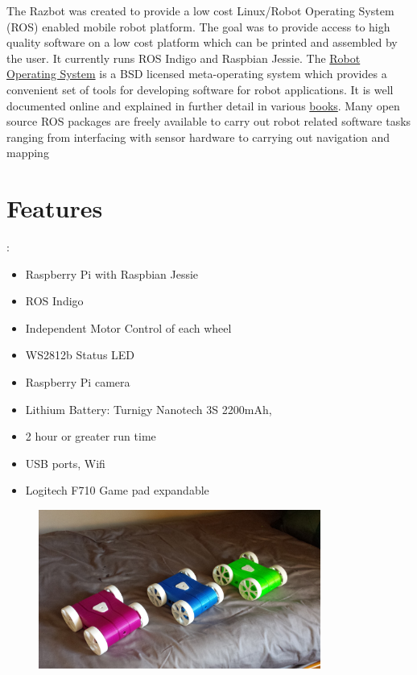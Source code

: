 \documentclass[12pt,titlepage,oneside]{memoir}
\begin{document}
The Razbot was created to provide a low cost Linux/Robot Operating System (ROS) enabled mobile robot platform. The goal was to provide access to high quality software on a low cost platform which can be printed and assembled by the user. It currently runs ROS Indigo and Raspbian Jessie. The \href{http://wiki.ros.org/ROS/Introduction}{Robot Operating System} is a BSD licensed meta-operating system which provides a convenient set of tools for developing software for robot applications. It is well documented online and explained in further detail in various \href{http://wiki.ros.org/Books}{books}. Many open source ROS packages are freely available to carry out robot related software tasks ranging from interfacing with sensor hardware to carrying out navigation and mapping \\

\section{Features}:
\begin{itemize}
\item Raspberry Pi with Raspbian Jessie
\item ROS Indigo
\item Independent Motor Control of each wheel
\item WS2812b Status LED
\item Raspberry Pi camera
\item Lithium Battery: Turnigy Nanotech 3S 2200mAh,
\item 2 hour or greater run time
\item USB ports, Wifi
\item Logitech F710 Game pad expandable
\end{itemize}

\pagebreak
\begin{figure}[!htbp]
\includegraphics[width=350px]{picture/3bots.jpg}
\centering
\end{figure}
\end{document}
